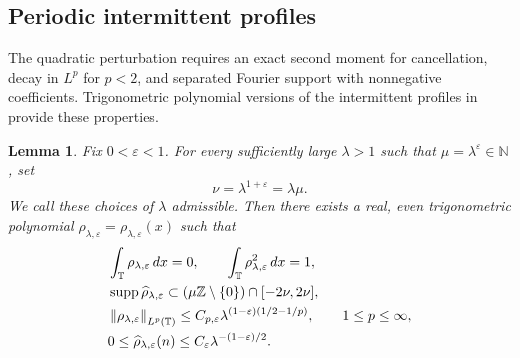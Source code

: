 \documentclass[12pt,reqno,letterpaper]{amsart}
\numberwithin{equation}{section}
\newtheorem{lemma}[theorem]{Lemma}
\theoremstyle{definition}
\newcommand{\T}{\mathbb T}
\newcommand{\Z}{\mathbb Z}
\newcommand{\eps}{\varepsilon}
\newcommand{\la}{\lambda}
\newcommand{\supp}{\operatorname{supp}}
\newcommand{\norm}[1]{\left\lVert #1\right\rVert}
\begin{document}
\subsection{Periodic intermittent profiles}

The quadratic perturbation requires an exact second moment for cancellation,
decay in $L^p$ for $p<2$, and separated Fourier support with nonnegative
coefficients.  Trigonometric polynomial versions of the intermittent profiles
in~\cite{GMPR} provide these properties.

\begin{lemma}\label{lem:slab}
Fix $0<\eps<1$.  For every sufficiently large
$\la>1$ such that $\mu=\la^\eps\in\mathbb N$, set
\begin{equation*}
 \nu=\la^{1+\eps}=\la\mu.
\end{equation*}
We call these choices of $\la$ admissible.
Then there exists a real, even trigonometric polynomial
$\rho_{\la,\eps}=\rho_{\la,\eps}(x)$ such that
\begin{align}
 &\int_\T\rho_{\la,\eps}\,dx=0,
 \qquad \int_\T\rho_{\la,\eps}^2\,dx=1,
 \label{eq:slabmoments}\\
 &\supp\widehat\rho_{\la,\eps}
 \subset(\mu\Z\setminus\{0\})\cap[-2\nu,2\nu],
 \notag\\
 &\norm{\rho_{\la,\eps}}_{L^p(\T)}
 \leq C_{p,\eps}\la^{(1-\eps)(1/2-1/p)},
 \qquad1\leq p\leq\infty,
 \label{eq:slabLp}\\
 &0\leq\widehat\rho_{\la,\eps}(n)
 \leq C_\eps\la^{-(1-\eps)/2}.
 \label{eq:slab-coefficient-bound}
\end{align}
\end{lemma}
\end{document}
